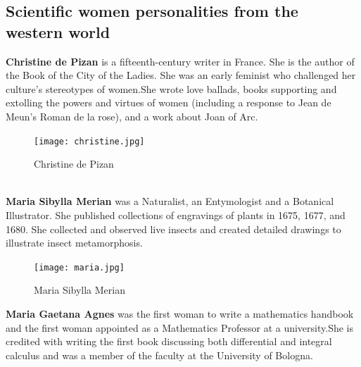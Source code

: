 \documentclass[a4paper,10pt]{article}
\begin{document}
\subsection{Scientific women personalities from the western world}
\newblock
\textbf{Christine de Pizan} is a fifteenth-century writer in France. She is the author of the Book of the City of the Ladies. She was an early feminist who challenged her culture's stereotypes of women.She wrote love ballads, books supporting and extolling the powers and virtues of women (including a response to Jean de Meun's Roman de la rose), and a work about Joan of Arc.\cite{christine}\\

\begin{center}
\begin{figure}[h]
\centering
 \texttt{[image: christine.jpg]}
 \caption{Christine de Pizan}
\end{figure}
\end{center}

\newblock
\\
\textbf{Maria Sibylla Merian} was a Naturalist, an Entymologist and a Botanical Illustrator. She published collections of engravings of plants in 1675, 1677, and 1680. She collected and observed live insects and created detailed drawings to illustrate insect metamorphosis.\cite{merian}

\begin{center}
\begin{figure}[h]
\centering
 \texttt{[image: maria.jpg]}
 \caption{Maria Sibylla Merian}
\end{figure}
\end{center}

\newblock
\textbf{Maria Gaetana Agnes} was the first woman to write a mathematics handbook and the first woman appointed as a Mathematics Professor at a university.She is credited with writing the first book discussing both differential and integral calculus and was a member of the faculty at the University of Bologna\cite{agnesi}.
\end{document}
